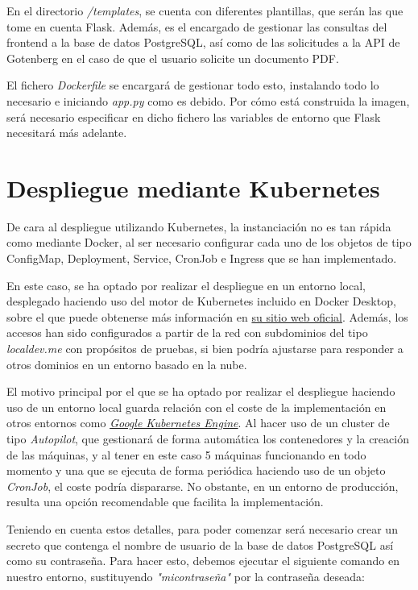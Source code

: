 \documentclass{report}
\begin{document}
            En el directorio \textit{/templates}, se cuenta con diferentes plantillas, que serán las que tome en cuenta Flask. Además, es el encargado de gestionar las consultas del frontend a la base de datos PostgreSQL, así como de las solicitudes a la API de Gotenberg en el caso de que el usuario solicite un documento PDF.

            El fichero \textit{Dockerfile} se encargará de gestionar todo esto, instalando todo lo necesario e iniciando \textit{app.py} como es debido. Por cómo está construida la imagen, será necesario especificar en dicho fichero las variables de entorno que Flask necesitará más adelante.

        \section{Despliegue mediante Kubernetes}

            De cara al despliegue utilizando Kubernetes, la instanciación no es tan rápida como mediante Docker, al ser necesario configurar cada uno de los objetos de tipo ConfigMap, Deployment, Service, CronJob e Ingress que se han implementado.

            En este caso, se ha optado por realizar el despliegue en un entorno local, desplegado haciendo uso del motor de Kubernetes incluido en Docker Desktop, sobre el que puede obtenerse más información en \href{https://docs.docker.com/desktop/features/kubernetes/}{su sitio web oficial}. Además, los accesos han sido configurados a partir de la red con subdominios del tipo \textit{localdev.me} con propósitos de pruebas, si bien podría ajustarse para responder a otros dominios en un entorno basado en la nube.

            El motivo principal por el que se ha optado por realizar el despliegue haciendo uso de un entorno local guarda relación con el coste de la implementación en otros entornos como \textit{\href{https://cloud.google.com/kubernetes-engine/pricing}{Google Kubernetes Engine}}. Al hacer uso de un cluster de tipo \textit{Autopilot}, que gestionará de forma automática los contenedores y la creación de las máquinas, y al tener en este caso 5 máquinas funcionando en todo momento y una que se ejecuta de forma periódica haciendo uso de un objeto \textit{CronJob}, el coste podría dispararse. No obstante, en un entorno de producción, resulta una opción recomendable que facilita la implementación.

            Teniendo en cuenta estos detalles, para poder comenzar será necesario crear un secreto que contenga el nombre de usuario de la base de datos PostgreSQL así como su contraseña. Para hacer esto, debemos ejecutar el siguiente comando en nuestro entorno, sustituyendo \textit{"micontraseña"} por la contraseña deseada:
\end{document}
